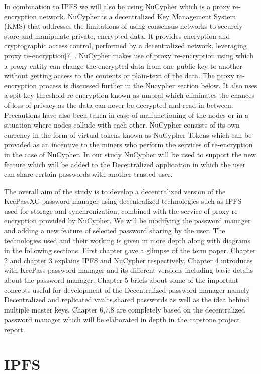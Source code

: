 \documentclass[12pt]{article}
\begin{document}
In combination to IPFS we will also be using NuCypher which is a proxy re-encryption network. NuCypher is a decentralized Key Management System (KMS) that addresses the limitations of using consensus networks to securely store and manipulate private, encrypted data. It provides encryption and cryptographic access control, performed by a decentralized network, leveraging proxy re-encryption[7] .  NuCypher makes use of proxy re-encryption using which a proxy entity can change the encrypted data from one public key to another without getting access to the contents or plain-text of the data. The proxy re-encryption process is discussed further in the Nucypher section below. It also uses a spit-key threshold re-encryption known as umbral which eliminates the chances of loss of privacy as the data can never be decrypted and read in between. Precautions have also been taken in case of malfunctioning of the nodes or in a situation where nodes collude with each other. NuCypher consists of its own currency in the form of virtual tokens known as NuCypher Tokens which can be provided as an incentive to the miners who perform the services of re-encryption in the case of NuCypher. In our study NuCypher will be used to support the new feature which will be added to the Decentralized application in which the user can share certain passwords with another trusted user.

The overall aim of the study is to develop a decentralized version of the KeePassXC password manager using decentralized technologies such as IPFS used for storage and synchronization, combined with the service of proxy re-encryption provided by NuCypher. We will be modifying the password manager and adding a new feature of selected password sharing by the user. The technologies used and their working is given in more depth along with diagrams in the following sections. First chapter gave a glimpse of the term paper. Chapter 2 and chapter 3 explains IPFS and NuCypher respectively. Chapter 4 introduces with KeePass password manager and its different versions including basic details about the password manager. Chapter 5 briefs about some of the important concepts useful for development of the Decentralized password manager namely Decentralized and replicated vaults,shared passwords as well as the idea behind multiple master keys. Chapter 6,7,8 are completely based on the decentralized password manager which will be elaborated in depth in the capstone project report. 

\section{IPFS}
\end{document}
